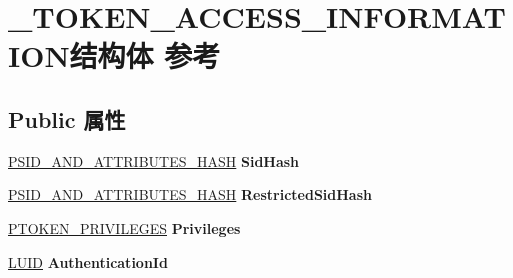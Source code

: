 \hypertarget{struct___t_o_k_e_n___a_c_c_e_s_s___i_n_f_o_r_m_a_t_i_o_n}{}\section{\+\_\+\+T\+O\+K\+E\+N\+\_\+\+A\+C\+C\+E\+S\+S\+\_\+\+I\+N\+F\+O\+R\+M\+A\+T\+I\+O\+N结构体 参考}
\label{struct___t_o_k_e_n___a_c_c_e_s_s___i_n_f_o_r_m_a_t_i_o_n}
\subsection*{Public 属性}
\begin{DoxyCompactItemize}
\item 
\mbox{\label{struct___t_o_k_e_n___a_c_c_e_s_s___i_n_f_o_r_m_a_t_i_o_n_a1435da128474bfddb1b12a9d6f7fe947}} 
\hyperlink{struct___s_i_d___a_n_d___a_t_t_r_i_b_u_t_e_s___h_a_s_h}{P\+S\+I\+D\+\_\+\+A\+N\+D\+\_\+\+A\+T\+T\+R\+I\+B\+U\+T\+E\+S\+\_\+\+H\+A\+SH} {\bfseries Sid\+Hash}
\item 
\mbox{\label{struct___t_o_k_e_n___a_c_c_e_s_s___i_n_f_o_r_m_a_t_i_o_n_ab581e7ef867703cbbf64e469336d12e3}} 
\hyperlink{struct___s_i_d___a_n_d___a_t_t_r_i_b_u_t_e_s___h_a_s_h}{P\+S\+I\+D\+\_\+\+A\+N\+D\+\_\+\+A\+T\+T\+R\+I\+B\+U\+T\+E\+S\+\_\+\+H\+A\+SH} {\bfseries Restricted\+Sid\+Hash}
\item 
\mbox{\label{struct___t_o_k_e_n___a_c_c_e_s_s___i_n_f_o_r_m_a_t_i_o_n_a66b1ef103444878ecc02902165923af8}} 
\hyperlink{struct___t_o_k_e_n___p_r_i_v_i_l_e_g_e_s}{P\+T\+O\+K\+E\+N\+\_\+\+P\+R\+I\+V\+I\+L\+E\+G\+ES} {\bfseries Privileges}
\item 
\mbox{\label{struct___t_o_k_e_n___a_c_c_e_s_s___i_n_f_o_r_m_a_t_i_o_n_a32f705a55bc7e5210eab21c569110b11}} 
\hyperlink{struct___l_u_i_d}{L\+U\+ID} {\bfseries Authentication\+Id}
\item 
\mbox{\label{struct___t_o_k_e_n___a_c_c_e_s_s___i_n_f_o_r_m_a_t_i_o_n_a5606a23d23e362d25186eda69bc9917b}} 

\end{DoxyCompactItemize}
